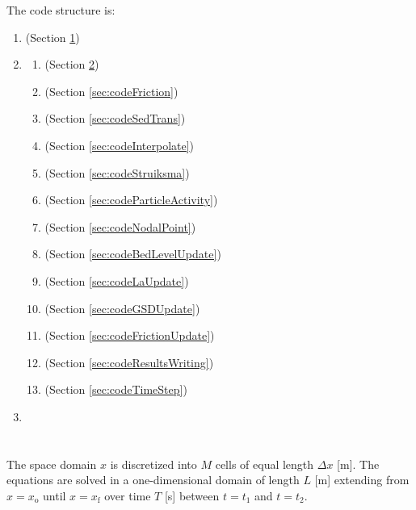\documentclass{deltares_report_elv}
\newcommand{\mathsub}[2]{#1_{\mathrm{#2}}}
\begin{document}
The code structure is:
\begin{enumerate}[label*=\arabic*.]
\item \codeInit{} (Section \ref{sec:codeInit})
\item \codeTimeLoop{} 
\begin{enumerate}[label*=\arabic*.]
\item \codeFlowUpdate{} (Section \ref{sec:codeFlowUpdate})
\item \codeFriction{} (Section \ref{sec:codeFriction})
\item \codeSedTrans{} (Section \ref{sec:codeSedTrans})
\item \codeInterpolate{} (Section \ref{sec:codeInterpolate})
\item \codeStruiksma{} (Section \ref{sec:codeStruiksma})
\item \codeParticleActivity{} (Section \ref{sec:codeParticleActivity})
\item \codeNodalPoint{} (Section \ref{sec:codeNodalPoint})
\item \codeBedLevelUpdate{} (Section \ref{sec:codeBedLevelUpdate})
\item \codeLaUpdate{} (Section \ref{sec:codeLaUpdate})
\item \codeGSDUpdate{} (Section \ref{sec:codeGSDUpdate})
\item \codeFrictionUpdate{} (Section \ref{sec:codeFrictionUpdate})
\item \codeResultsWriting{} (Section \ref{sec:codeResultsWriting})
\item \codeTimeStep{} (Section \ref{sec:codeTimeStep})
\end{enumerate}
\item{\codeFinal{}}
\end{enumerate}

\section{\codeInit{}}
\label{sec:codeInit}

The space domain $x$ is discretized into $M$ cells of equal length $\Delta x$ [\si{m}]. The equations are solved in a one-dimensional domain of length $L$ [\si{m}] extending from $x=\mathsub{x}{o}$ until $x=\mathsub{x}{f}$ over time $T$ [\si{s}] between $t=\mathsub{t}{1}$ and $t=\mathsub{t}{2}$. 

\section{\codeFlowUpdate{}}
\label{sec:codeFlowUpdate}
\end{document}
